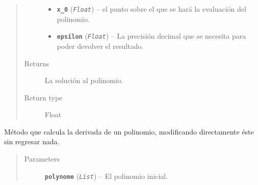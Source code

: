 \documentclass[letterpaper,10pt,english]{sphinxmanual}
\begin{document}
\begin{fulllineitems}
\begin{quote}
\begin{description}
\begin{itemize}
\item {} 
\textbf{\texttt{x\_0}} (\emph{\texttt{Float}}) -- el punto sobre el que se hará la evaluación del polinomio.

\item {} 
\textbf{\texttt{epsilon}} (\emph{\texttt{Float}}) -- La precisión decimal que se necesita para poder devolver
el resultado.

\end{itemize}

\item[{Returns}] \leavevmode
La solución al polinomio.

\item[{Return type}] \leavevmode
Float

\end{description}\end{quote}

\end{fulllineitems}


\begin{fulllineitems}
\label{Model/Fitness/NonLinearRankingFitness:Model.Fitness.NonLinearRankingFitness.derivate}
Método que calcula la derivada de un polinomio, modificando
directamente éste sin regresar nada.
\begin{quote}\begin{description}
\item[{Parameters}] \leavevmode
\textbf{\texttt{polynome}} (\emph{\texttt{List}}) -- El polinomio inicial.

\end{description}\end{quote}

\end{fulllineitems}

\end{document}
